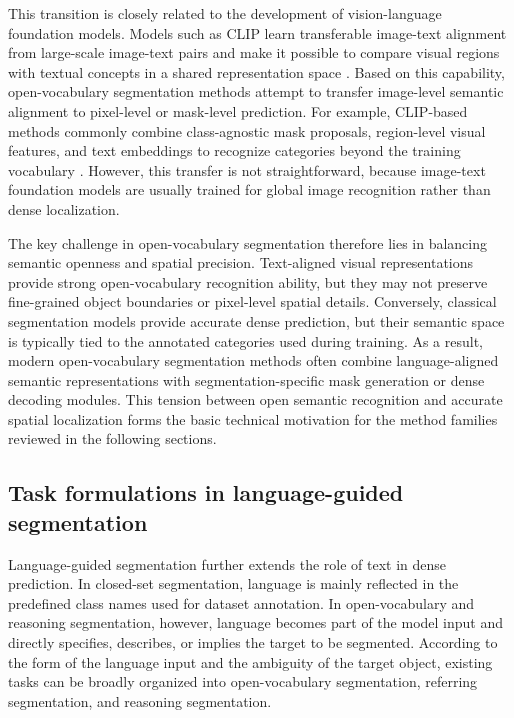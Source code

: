 This transition is closely related to the development of vision-language foundation models. 
Models such as CLIP learn transferable image-text alignment from large-scale image-text pairs and make it possible to compare visual regions with textual concepts in a shared representation space \cite{Radford2021}. 
Based on this capability, open-vocabulary segmentation methods attempt to transfer image-level semantic alignment to pixel-level or mask-level prediction. 
For example, CLIP-based methods commonly combine class-agnostic mask proposals, region-level visual features, and text embeddings to recognize categories beyond the training vocabulary \cite{Liang2023,Xu2023b}. 
However, this transfer is not straightforward, because image-text foundation models are usually trained for global image recognition rather than dense localization.

The key challenge in open-vocabulary segmentation therefore lies in balancing semantic openness and spatial precision. 
Text-aligned visual representations provide strong open-vocabulary recognition ability, but they may not preserve fine-grained object boundaries or pixel-level spatial details. 
Conversely, classical segmentation models provide accurate dense prediction, but their semantic space is typically tied to the annotated categories used during training. 
As a result, modern open-vocabulary segmentation methods often combine language-aligned semantic representations with segmentation-specific mask generation or dense decoding modules. 
This tension between open semantic recognition and accurate spatial localization forms the basic technical motivation for the method families reviewed in the following sections.

\subsection{Task formulations in language-guided segmentation}
\label{subsec:language_guided_tasks}

Language-guided segmentation further extends the role of text in dense prediction. 
In closed-set segmentation, language is mainly reflected in the predefined class names used for dataset annotation. 
In open-vocabulary and reasoning segmentation, however, language becomes part of the model input and directly specifies, describes, or implies the target to be segmented. 
According to the form of the language input and the ambiguity of the target object, existing tasks can be broadly organized into open-vocabulary segmentation, referring segmentation, and reasoning segmentation.

